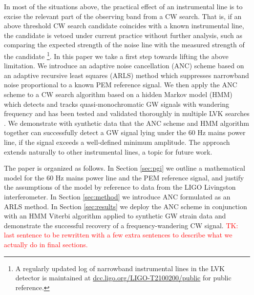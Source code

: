 \documentclass[pra,superscriptaddress,reprint,amsmath,amssymb,nofootinbib]{revtex4-2}
\begin{document}
In most  of the situations above, the practical effect of an instrumental line is to excise the relevant part of the observing band from a CW search. That is, if an above threshold CW search candidate coincides with a known instrumental line, the candidate is vetoed under current practice without further analysis, such as comparing the expected strength of the noise line with the measured strength of the candidate \footnote{A regularly updated log of narrowband instrumental lines in the LVK detector is maintained at \href{https://dcc.ligo.org/LIGO-T2100200/public}{dcc.ligo.org/LIGO-T2100200/public} for public reference.}. In this paper we take a first step towards lifting the above limitation. We introduce an adaptive noise cancellation (ANC) scheme  based on an adaptive recursive least squares (ARLS) method which suppresses narrowband noise proportional to a known PEM reference signal. We then apply the ANC scheme to a CW search algorithm based on a hidden Markov model (HMM) which detects and tracks quasi-monochromatic GW signals with wandering frequency and has been tested and validated thoroughly in multiple LVK searches \cite{Suvorova2016PhRv,Piccinni2022,Riles2023,Wette2023}. We demonstrate with synthetic data that the ANC scheme and HMM algorithm together can successfully detect a GW signal lying under the 60 Hz mains power line, if the signal exceeds a well-defined minimum amplitude. The approach extends naturally to other instrumental lines, a topic for future work. \newline 

The paper is organized as follows. In Section \ref{sec:pgi} we outline a mathematical model for the 60 Hz mains power line and the PEM reference signal, and justify the assumptions of the model by reference to data from the LIGO Livingston interferometer.  In Section \ref{sec:method} we introduce ANC formulated as an ARLS method. In Section \ref{sec:results} we deploy the ANC scheme in conjunction with an HMM Viterbi algorithm applied to synthetic GW strain data and demonstrate the successful recovery of a frequency-wandering CW signal. \textcolor{red}{TK: last sentence to be rewritten with a few extra sentences to describe what we actually do in final sections.}
\end{document}
